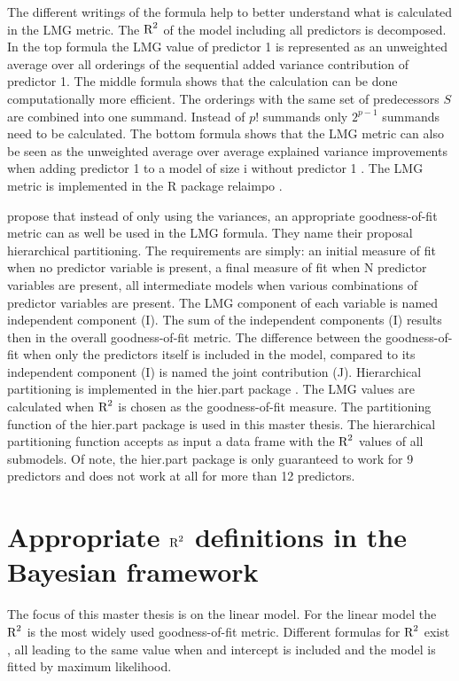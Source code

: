 \documentclass[11pt,a4paper,twoside]{book}
\begin{document}
   The different writings of the formula help to better understand what is calculated in the LMG metric. The $\text{R}^2$ of the model including all predictors is decomposed. In the top formula the LMG value of predictor 1 is represented as an unweighted average over all orderings of the sequential added variance contribution of predictor 1. The middle formula shows that the calculation can be  done computationally more efficient. The orderings with the same set of predecessors $S$ are combined into one summand. Instead of $p!$ summands only $2^{p-1}$ summands need to be calculated. The bottom formula shows that the LMG metric can also be seen as the unweighted average over average explained variance improvements when adding predictor 1 to a model of size i without predictor 1 \citep{Gromping2015}. The LMG metric is implemented in the R package relaimpo \citep{Gromping2006}.
   
\cite{Chevan1991} propose that instead of only using the variances, an appropriate goodness-of-fit metric can as well be used in the LMG formula. They name their proposal hierarchical partitioning. The requirements are simply: an initial measure of fit when no predictor variable is present, a final measure of fit when N predictor variables are present, all intermediate models when various combinations of predictor variables are present. 
  The LMG component of each variable is named independent component (I). The sum of the independent components (I) results then in the overall goodness-of-fit metric. The difference between the goodness-of-fit when only the predictors itself is included in the model, compared to its independent component (I) is named the joint contribution (J). Hierarchical partitioning is implemented in the hier.part package \citep{Walsh2015}. The LMG values are calculated when  $\text{R}^2$ is chosen as the goodness-of-fit measure.  The partitioning function of the hier.part package is used in this master thesis. The hierarchical partitioning function accepts as input a data frame with the $\text{R}^2$ values of all submodels. Of note,  the hier.part package is only guaranteed to work for 9 predictors and does not work at all for more than 12 predictors.
  
\section{ Appropriate $\text{R}^2$ definitions in the Bayesian framework}
The focus of this master thesis is on the linear model. For the linear model the $\text{R}^2$ is the most widely used goodness-of-fit metric.  Different formulas for $\text{R}^2$ exist \cite{Kvalseth1985}, all leading to the same value when and intercept is included and the model is fitted by maximum likelihood. 
\end{document}
